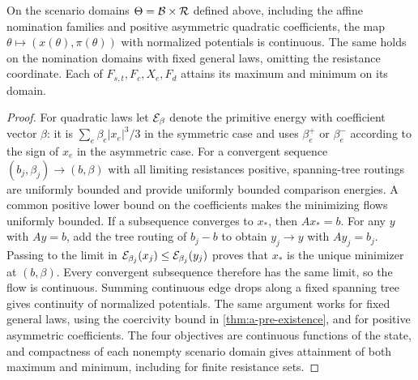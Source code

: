 \begin{lemma}
\label{lem:a-pre-attainment}
On the scenario domains $\Theta=\mathcal{B}\times\mathcal{R}$ defined above,
including the affine nomination families and positive asymmetric
quadratic coefficients, the map
$\theta\mapsto(x(\theta),\pi(\theta))$ with normalized potentials is
continuous. The same holds on the nomination domains with fixed general
laws, omitting the resistance coordinate. Each of $F_{s,t},F_c,X_e,F_d$
attains its maximum and minimum on its domain.
\end{lemma}
\begin{proof}
For quadratic laws let $\mathcal{E}_\beta$ denote the primitive energy with
coefficient vector $\beta$: it is $\sum_e\beta_e|x_e|^3/3$ in the
symmetric case and uses $\beta_e^+$ or $\beta_e^-$ according to the sign
of $x_e$ in the asymmetric case. For a convergent sequence
$(b_j,\beta_j)\to(b,\beta)$ with all limiting resistances positive,
spanning-tree routings are uniformly bounded and provide uniformly
bounded comparison energies. A common positive lower bound on the
coefficients makes the minimizing flows uniformly bounded. If a
subsequence converges to $x_*$, then $Ax_*=b$. For any $y$ with $Ay=b$,
add the tree routing of $b_j-b$ to obtain $y_j\to y$ with $Ay_j=b_j$.
Passing to the limit in $\mathcal{E}_{\beta_j}(x_j)\le
\mathcal{E}_{\beta_j}(y_j)$ proves that $x_*$ is the unique minimizer at
$(b,\beta)$. Every convergent subsequence therefore has the same limit,
so the flow is continuous. Summing continuous edge drops along a
fixed spanning tree gives continuity of normalized potentials. The
same argument works for fixed general laws, using the coercivity bound
in \cref{thm:a-pre-existence}, and for positive asymmetric coefficients.
The four objectives are continuous functions of the state, and
compactness of each nonempty scenario domain gives attainment of both
maximum and minimum, including for finite resistance sets.
\end{proof}

